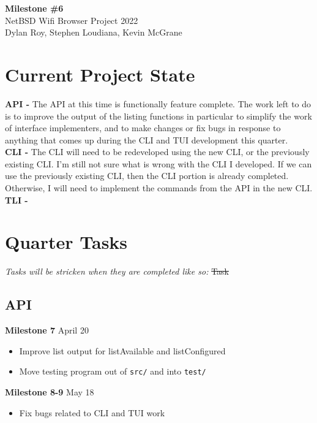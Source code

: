 \documentclass[11pt]{article}
\begin{document}
\begin{center}
  \textbf{\Large Milestone \#6}\\\large NetBSD Wifi Browser Project 2022\\
  Dylan Roy, Stephen Loudiana, Kevin McGrane
\end{center}


\section*{Current Project State}
\textbf{API -} The API at this time is functionally feature complete.
The work left to do is to improve the output of the listing functions in
particular to simplify the work of interface implementers, and to make
changes or fix bugs in response to anything that comes up during the CLI
and TUI development this quarter.\\

\textbf{CLI -} The CLI will need to be redeveloped using the new CLI, or the 
previously existing CLI. I'm still not sure what is wrong with the CLI I developed.
If we can use the previously existing CLI, then the CLI portion is already completed. 
Otherwise, I will need to implement the commands from the API in the new CLI. \\

\textbf{TLI -} \\

\section*{Quarter Tasks}

\textit{Tasks will be stricken when they are completed like so:} \sout{Task}

\subsection*{API}
\textbf{Milestone 7} April 20
\begin{itemize}
  \item Improve list output for listAvailable and listConfigured
  \item Move testing program out of \texttt{src/} and into \texttt{test/}
\end{itemize}
\textbf{Milestone 8-9} May 18
\begin{itemize}
  \item Fix bugs related to CLI and TUI work
\end{itemize}
\end{document}
